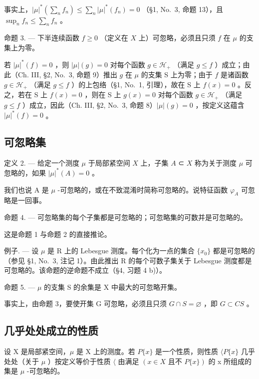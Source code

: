 事实上，\(|\mu|^*(\sum_n f_n) \leqslant \sum_n |\mu|^*(f_n) = 0\) （§1, No.~3, 命题 13），且 \(\sup_n f_n \leqslant \sum_n f_n\) 。

命题 3. --- 下半连续函数 \(f \geqslant 0\) （定义在 \(X\) 上）可忽略，必须且只须 \(f\) 在 \(\mu\) 的支集上为零。

若 \(|\mu|^*(f) = 0\) ，则 \(|\mu|(g) = 0\) 对每个函数 \(g \in \mathcal{H}_+\) （满足 \(g \leqslant f\) ）成立；由此（Ch. III, §2, No.~3, 命题 9）推出 \(g\) 在 \(\mu\) 的支集 S 上为零；由于 \(f\) 是诸函数 \(g \in \mathcal{H}_+\) （满足 \(g \leqslant f\) ）的上包络（§1, No.~1, 引理），故在 S 上 \(f(x) = 0\) 。反之，若在 S 上 \(f(x) = 0\) ，则在 S 上 \(g(x) = 0\) 对每个函数 \(g \in \mathcal{H}_+\) （满足 \(g \leqslant f\) ）成立，因此（Ch. III, §2, No.~3, 命题 8）\(|\mu|(g) = 0\) ，按定义这蕴含 \(|\mu|^*(f) = 0\) 。

\subsection{可忽略集}

定义 2. --- 给定一个测度 \(\mu\) 于局部紧空间 \(X\) 上，子集 \(A\) ⊂ \(X\) 称为关于测度 \(\mu\) 可忽略的，如果 \(|\mu|^*(A) = 0\) 。

我们也说 A 是 \(\mu\) -可忽略的，或在不致混淆时简称可忽略的。说特征函数 \(\varphi_{A}\) 可忽略是一回事。

命题 4. --- 可忽略集的每个子集都是可忽略的；可忽略集的可数并是可忽略的。

这是命题 1 与命题 2 的直接推论。

例子. --- 设 \(\mu\) 是 R 上的 Lebesgue 测度。每个化为一点的集合 \(\{x_{0}\}\) 都是可忽略的（参见 §1, No.~3, 注记 1）。由此推出 R 的每个可数子集关于 Lebesgue 测度都是可忽略的。该命题的逆命题不成立（§4, 习题 4 b)）。

命题 5. --- \(\mu\) 的支集 S 的余集是 X 中最大的可忽略开集。

事实上，由命题 3，要使开集 G 可忽略，必须且只须 \(G \cap S = \varnothing\) ，即 \(G \subset CS\) 。

\subsection{几乎处处成立的性质}

设 X 是局部紧空间，\(\mu\) 是 X 上的测度。若 \(P\{x\}\) 是一个性质，则性质 \(\langle P\{x\}\) 几乎处处（关于 \(\mu\) ）按定义等价于性质 \(\langle\) 由满足 \((x \in X \text{ 且不 } P\{x\})\) 的 x 所组成的集是 \(\mu\) -可忽略的。

